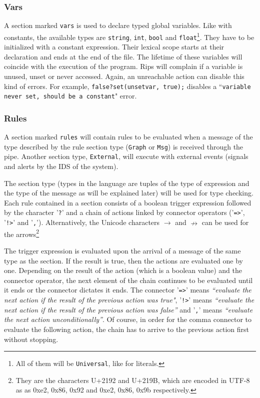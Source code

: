 \documentclass[a4paper]{article}
\begin{document}
\subsubsection{Vars}
A section marked \texttt{vars} is used to declare typed global variables.
Like with constants, the available types are \texttt{string},
\texttt{int}, \texttt{bool} and \texttt{float}\footnote{All of them will be \texttt{Universal}, like
for literals.}.  They have to be
initialized with a constant expression. Their lexical scope starts  at
their declaration and ends at the end of the file.  The lifetime of these
variables will coincide with the execution of the program.  Rips will
complain if a variable is unused, unset or never accessed. Again, an
unreachable action can disable this kind of errors. For example,
 \verb+false?set(unsetvar, true);+ disables a
``\texttt{variable never set, should be a constant}" error.


\subsubsection{Rules}
A section marked \texttt{rules} will contain rules to be evaluated when
a message of the type described by the rule section type (\texttt{Graph} or
\texttt{Msg}) is received through the pipe. Another section type,
\texttt{External}, will execute with external events (signals and alerts by
the IDS of the system).

The section type (types in the language
are tuples of the type of expression and the type of the message as will
be explained later) will be
used for type checking.  Each rule contained in a section consists of
a boolean trigger expression followed by the character '\verb+?+' and a
chain of actions linked by connector operators ('\verb+=>+', '\verb+!>+'
and '\verb+,+'). Alternatively, the Unicode characters
$\rightarrow$ and $\nrightarrow$ can be used
for the arrows\footnote{They are the characters U+2192 and U+219B, which are
encoded in UTF-8 as as 0xe2, 0x86, 0x92  and  0xe2, 0x86, 0x9b respectively.}

The trigger expression is evaluated upon the arrival of
a message of the same type as the section. If the result is true, then the
actions are evaluated one by one. Depending on the result of the action
(which is a boolean value) and the connector operator, the next element
of the chain continues to be evaluated until it ends or the connector
dictates it ends.  The connector  '\verb+=>+' means \emph{``evaluate the
next action if the result of the previous action was true"}, '\verb+!>+' means \emph{``evaluate the
next action if the result of the previous action
was false''}
and '\verb+,+' means \emph{``evaluate the next action unconditionally''}.
Of course, in order for the comma connector to evaluate the following action, the chain has
to arrive to the previous action first without stopping.
\end{document}
